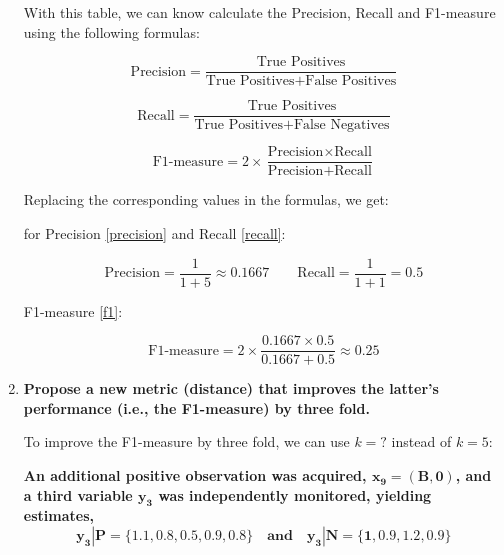 \documentclass[12pt]{article}
\begin{document}
\begin{enumerate}[leftmargin=\labelsep]
    With this table, we can know calculate the Precision, Recall and F1-measure using the following formulas:

    \begin{equation}\label{precision}
        \text{Precision} = \frac{\text{True Positives}}{{\text{True Positives} +
        \text{False Positives}}}
    \end{equation}

    \begin{equation}\label{recall}
        \text{Recall} = \frac{\text{True Positives}}{{\text{True Positives} + \text{False Negatives}}}
    \end{equation}

    \begin{equation}\label{f1}
        \text{F1-measure} = 2 \times \frac{{\text{Precision} \times \text{Recall}}}{{\text{Precision} + \text{Recall}}}
    \end{equation}

    \vspace{10pt}
    Replacing the corresponding values in the formulas, we get:

    \vspace{10pt}
    for Precision \eqref{precision} and Recall \eqref{recall}:

    \begin{equation*}
        \text{Precision} = \frac{1}{1 + 5} \approx 0.1667 \quad \quad
        \text{Recall} = \frac{1}{1 + 1} = 0.5
    \end{equation*}

    F1-measure \eqref{f1}:

    \begin{equation*}
        \text{F1-measure} = 2 \times \frac{0.1667 \times 0.5}{0.1667 + 0.5} \approx 0.25
    \end{equation*}

    \newpage
    \item \textbf{Propose a new metric (distance) that improves the latter's performance (i.e., the
    F1-measure) by three fold.} 
    
    \vspace{10pt}
    
    To improve the F1-measure by three fold, we can use $k = ? $ instead of $k = 5$:



    
    \vspace{15pt}
    \textbf{An additional positive observation was acquired, $\boldsymbol{x_9 = (B,0)}$, and a third variable $\boldsymbol{y_3}$
    was independently monitored, yielding estimates,}
    \[
    \boldsymbol{y_3|P = \{1.1, 0.8, 0.5, 0.9, 0.8\} \quad and \quad y_3|N = \{1, 0.9, 1.2, 0.9\}}
    \]


\end{enumerate}
\end{document}
